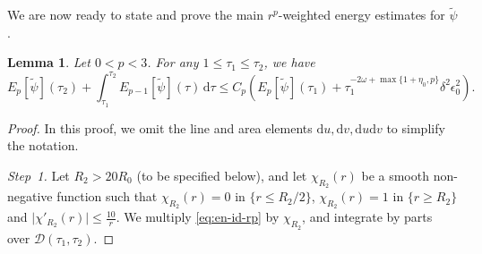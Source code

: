 \documentclass[10pt, reqno]{amsart}
\newtheorem{lemma}[theorem]{Lemma}
\theoremstyle{definition}
\theoremstyle{remark}
\theoremstyle{conjecture}
\numberwithin{equation}{section}
\newcommand{\abs}[1]{\vert#1\vert}
\newcommand{\set}[1]{\{#1\}}
\newcommand{\ud}{\mathrm{d}}
\newcommand{\0}{\emptyset}
\newcommand{\dlt}{\delta}
\newcommand{\eps}{\epsilon}
\newcommand{\omg}{\omega}
\newcommand{\calD}{\mathcal D}
\newcommand{\pfstep}[1]{\vspace{.5em} {\it \noindent #1.}}
\newcommand{\psibg}{\overline{\psi}}				%
\newcommand{\psidf}{\widetilde{\psi}}				%
\begin{document}
We are now ready to state and prove the main $r^{p}$-weighted energy estimates for $\psidf$.
\begin{lemma} \label{lem:en-rp}
Let $0 < p < 3$. For any $1 \leq \tau_{1} \leq \tau_{2}$, we have
\begin{equation} \label{eq:en-rp}
	E_{p}[\psidf](\tau_{2}) + \int_{\tau_{1}}^{\tau_{2}} E_{p-1}[\psidf] (\tau) \, \ud \tau
	\leq C_{p} \left( E_{p}[\psidf](\tau_{1}) + \tau_{1}^{-2\omg + \max\set{1+\eta_{0}, p}} \dlt^{2} \eps_{0}^{2} \right).
\end{equation}
\end{lemma}

\begin{proof}
In this proof, we omit the line and area elements $\ud u, \ud v, \ud u \ud v$ to simplify the notation.

\pfstep{Step~1}
Let $R_{2} > 20 R_{0}$ (to be specified below), and let $\chi_{R_{2}}(r)$ be a smooth non-negative function such that $\chi_{R_{2}}(r) = 0$ in $\set{r \leq R_{2}/2}$, $\chi_{R_{2}}(r) = 1$ in $\set{r \geq R_{2}}$ and $\abs{\chi'_{R_{2}} (r)} \leq \frac{10}{r}$. We multiply \eqref{eq:en-id-rp} by $\chi_{R_{2}}$, and integrate by parts over $\calD(\tau_{1}, \tau_{2})$.


\end{proof}
\end{document}
